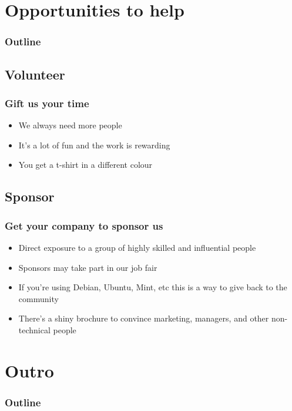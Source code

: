 \documentclass[t]{beamer}
\begin{document}
\section{Opportunities to help}

\begin{frame}
	\frametitle{Outline}
	\tableofcontents[currentsection]
\end{frame}

\subsection{Volunteer}

\begin{frame}
	\frametitle{Gift us your time}
	\vfill
	\begin{itemize}
		\item We always need more people
		\item It's a lot of fun and the work is rewarding
		\item You get a t-shirt in a different colour
	\end{itemize}
	\vfill
\end{frame}

\subsection{Sponsor}

\begin{frame}
	\frametitle{Get your company to sponsor us}
	\vfill
	\begin{itemize}
		\item Direct exposure to a group of highly skilled and influential people
		\item Sponsors may take part in our job fair
		\item If you're using Debian, Ubuntu, Mint, etc this is a way to give back to the community
		\item There's a shiny brochure to convince marketing, managers, and other non-technical people
	\end{itemize}
	\vfill
\end{frame}


\section{Outro}

\begin{frame}
	\frametitle{Outline}
	\tableofcontents[currentsection]
\end{frame}
\end{document}
